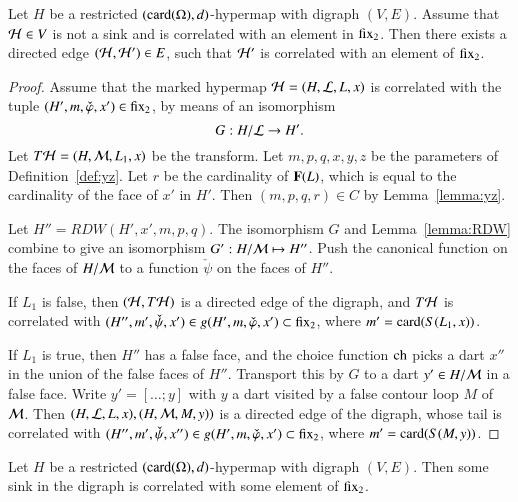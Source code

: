 \begin{lemma}\label{lemma:correlated-edge}
  Let $H$ be a restricted $({\operatorname{card}}(\Omega),d)$-hypermap with digraph $(V,E)$. 
  Assume that ${\cal H}\in V$ is not a
  sink and is correlated with an element in ${\operatorname{fix}}_2$.
  Then there exists a directed edge  $({\cal H},{\cal H}')\in E$, such that
 $\cal H'$ is correlated with an element of  ${\operatorname{fix}}_2$.
\end{lemma}

\begin{proof}  Assume that the marked hypermap ${\cal H}=(H,{\cal L},L,x)$
is correlated with the tuple $(H',m,\check\varphi,x')\in {\operatorname{fix}}_2$,
by means of an isomorphism
\begin{displaymath}
G: H/{\cal L} \to H'.
\end{displaymath}
Let $T{\cal H} = (H,{\cal M},L_1,x)$ be the transform.  Let $m,p,q,x,y,z$
be the parameters of Definition~\ref{def:yz}.  Let $r$ be the cardinality
of ${\mathbf F}(L)$, which is equal to the cardinality of the face of $x'$ in $H'$.  
Then $(m,p,q,r)\in C$ by Lemma~\ref{lemma:yz}.

Let $H'' = RDW(H',x',m,p,q)$.  The isomorphism $G$ and Lemma~\ref{lemma:RDW} combine to give an isomorphism $G':H/{\cal M} \mapsto H''$.
Push the canonical function on the faces of $H/{\cal M}$ to a function
$\check\psi$ on the faces of $H''$.

If $L_1$ is false, then $({\cal H},T{\cal H})$ is a directed edge of the digraph, and
$T{\cal H}$ is correlated with $(H'',m',\check\psi,x')\in g(H',m,\check\varphi,x')\subset {\operatorname{fix}}_2$, where $m'={\operatorname{card}}(S(L_1,x))$.  

If $L_1$ is true, then $H''$ has a false face, and the choice function ${\operatorname{ch}}$ picks a dart $x''$ in the union of the false faces of $H''$.  Transport this by $G$ to a dart $y'\in H/{\cal M}$ in a false face.  Write $y'=[\ldots;y]$
with $y$ a dart visited by a false contour loop $M$ of ${\cal M}$.  Then
$(H,{\cal L},L,x),(H,{\cal M},M,y))$ is a directed edge of the digraph,
whose tail is correlated with $(H'',m',\check\psi,x'')\in g(H',m,\check\varphi,x')\subset {\operatorname{fix}}_2$, where $m'={\operatorname{card}}(S(M,y))$.
\end{proof}

\begin{lemma}\label{lemma:correlated-sink}
Let $H$ be a restricted $({\operatorname{card}}(\Omega),d)$-hypermap with digraph $(V,E)$.
Then some sink in the digraph is correlated with some element of
${\operatorname{fix}}_2$.
\end{lemma}

